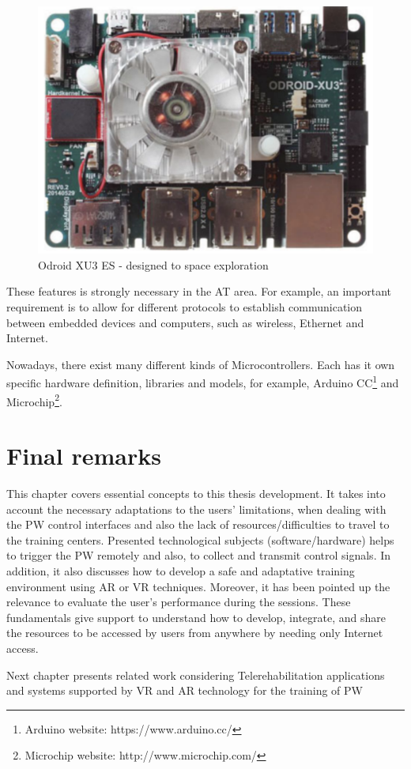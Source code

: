 \begin{figure}[!hbt]
\begin{center}
\includegraphics[width=0.7 \textwidth]{img/cap2/OdroidXU3-ES}
\caption{Odroid XU3 ES - designed to space exploration \cite{marwedel2018}}
\label{fig:OdroidXU3-ES}
\end{center}
\end{figure}



These features is strongly necessary in the AT area. For example, an important requirement is to allow for different protocols to establish communication between embedded devices and computers, such as wireless, Ethernet and Internet.

Nowadays, there exist many different kinds of Microcontrollers. Each has it own specific hardware definition, libraries and models, for example, Arduino CC\footnote{Arduino website: https://www.arduino.cc/} and Microchip\footnote{Microchip website: http://www.microchip.com/}.

\section{Final remarks}

This chapter covers essential concepts to this thesis development. It takes into account the necessary adaptations to the users' limitations, when dealing with the PW control interfaces and also the lack of resources/difficulties to travel to the training centers. Presented technological subjects (software/hardware)  helps to trigger the PW remotely and also, to collect and transmit control signals. In addition, it also discusses how to develop a safe and adaptative training environment using AR or VR techniques. Moreover, it has been pointed up the relevance to evaluate the user's performance during the sessions. These fundamentals give support to understand how to develop, integrate, and share the resources to be accessed by users from anywhere by needing only Internet access.

Next chapter presents related work considering Telerehabilitation applications and systems supported by VR and AR technology for the training of PW